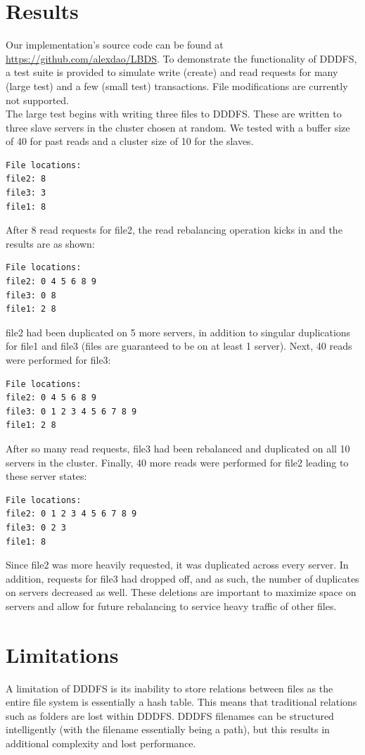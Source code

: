 \documentclass[twoside]{article}
\begin{document}
\begin{multicols}{2}
\section{Results}
Our implementation's source code can be found at \href{https://github.com/alexdao/LBDS}{https://github.com/alexdao/LBDS}. To demonstrate the functionality of DDDFS, a test suite is provided to simulate write (create) and read requests for many (large test) and a few (small test) transactions. File modifications are currently not supported. \\\indent
The large test begins with writing three files to DDDFS. These are written to three slave servers in the cluster chosen at random. We tested with a buffer size of 40 for past reads and a cluster size of 10 for the slaves.
\begin{verbatim}
File locations:
file2: 8
file3: 3
file1: 8
\end{verbatim}
After 8 read requests for file2, the read rebalancing operation kicks in and the results are as shown:
\begin{verbatim}
File locations:
file2: 0 4 5 6 8 9
file3: 0 8
file1: 2 8
\end{verbatim}
file2 had been duplicated on 5 more servers, in addition to singular duplications for file1 and file3 (files are guaranteed to be on at least 1 server). Next, 40 reads were performed for file3:
\begin{verbatim}
File locations:
file2: 0 4 5 6 8 9
file3: 0 1 2 3 4 5 6 7 8 9
file1: 2 8
\end{verbatim}
After so many read requests, file3 had been rebalanced and duplicated on all 10 servers in the cluster. Finally, 40 more reads were performed for file2 leading to these server states:
\begin{verbatim}
File locations:
file2: 0 1 2 3 4 5 6 7 8 9
file3: 0 2 3
file1: 8
\end{verbatim}
Since file2 was more heavily requested, it was duplicated across every server. In addition, requests for file3 had dropped off, and as such, the number of duplicates on servers decreased as well. These deletions are important to maximize space on servers and allow for future rebalancing to service heavy traffic of other files.

\section{Limitations}
A limitation of DDDFS is its inability to store relations between files as the entire file system is essentially a hash table. This means that traditional relations such as folders are lost within DDDFS. DDDFS filenames can be structured intelligently (with the filename essentially being a path), but this results in additional complexity and lost performance.


\end{multicols}
\end{document}
